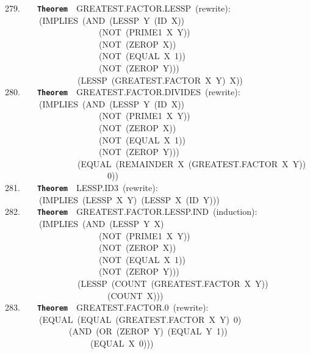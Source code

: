 \documentclass[11pt]{book}
\newenvironment{pubasis}{\begin{flushleft}\ttfamily\small}{\normalsize\rmfamily\end{flushleft}}
\newcommand{\axiomordefinition}[1]{\vspace{6pt}\texttt{\textbf{#1}}}
\begin{document}
\begin{pubasis}
279.~~~~\axiomordefinition{Theorem}~~GREAT\-EST.FAC\-TOR.LESSP~(rewrite):\\
~~~~~~~~(IMPLIES~(AND~(LESSP~Y~(ID~X))\\
~~~~~~~~~~~~~~~~~~~~~~(NOT~(PRIME1~X~Y))\\
~~~~~~~~~~~~~~~~~~~~~~(NOT~(ZEROP~X))\\
~~~~~~~~~~~~~~~~~~~~~~(NOT~(EQUAL~X~1))\\
~~~~~~~~~~~~~~~~~~~~~~(NOT~(ZEROP~Y)))\\
~~~~~~~~~~~~~~~~~(LESSP~(GREAT\-EST.FAC\-TOR~X~Y)~X))\\

280.~~~~\axiomordefinition{Theorem}~~GREAT\-EST.FAC\-TOR.DIVIDES~(rewrite):\\
~~~~~~~~(IMPLIES~(AND~(LESSP~Y~(ID~X))\\
~~~~~~~~~~~~~~~~~~~~~~(NOT~(PRIME1~X~Y))\\
~~~~~~~~~~~~~~~~~~~~~~(NOT~(ZEROP~X))\\
~~~~~~~~~~~~~~~~~~~~~~(NOT~(EQUAL~X~1))\\
~~~~~~~~~~~~~~~~~~~~~~(NOT~(ZEROP~Y)))\\
~~~~~~~~~~~~~~~~~(EQUAL~(REMAINDER~X~(GREAT\-EST.FAC\-TOR~X~Y))\\
~~~~~~~~~~~~~~~~~~~~~~~~0))\\

281.~~~~\axiomordefinition{Theorem}~~LESSP.ID3~(rewrite):\\
~~~~~~~~(IMPLIES~(LESSP~X~Y)~(LESSP~X~(ID~Y)))\\

282.~~~~\axiomordefinition{Theorem}~~GREAT\-EST.FAC\-TOR.LESSP.IND~(induction):\\
~~~~~~~~(IMPLIES~(AND~(LESSP~Y~X)\\
~~~~~~~~~~~~~~~~~~~~~~(NOT~(PRIME1~X~Y))\\
~~~~~~~~~~~~~~~~~~~~~~(NOT~(ZEROP~X))\\
~~~~~~~~~~~~~~~~~~~~~~(NOT~(EQUAL~X~1))\\
~~~~~~~~~~~~~~~~~~~~~~(NOT~(ZEROP~Y)))\\
~~~~~~~~~~~~~~~~~(LESSP~(COUNT~(GREAT\-EST.FAC\-TOR~X~Y))\\
~~~~~~~~~~~~~~~~~~~~~~~~(COUNT~X)))\\

283.~~~~\axiomordefinition{Theorem}~~GREAT\-EST.FAC\-TOR.0~(rewrite):\\
~~~~~~~~(EQUAL~(EQUAL~(GREAT\-EST.FAC\-TOR~X~Y)~0)\\
~~~~~~~~~~~~~~~(AND~(OR~(ZEROP~Y)~(EQUAL~Y~1))\\
~~~~~~~~~~~~~~~~~~~~(EQUAL~X~0)))\\


\end{pubasis}
\end{document}
